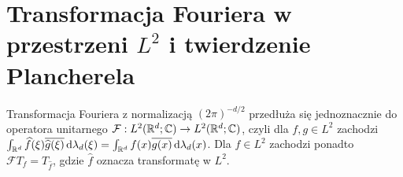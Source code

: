 \section{Transformacja Fouriera w przestrzeni $L^2$ i twierdzenie Plancherela}
\providecommand{\atlasref}[2]{#2}

\begin{twierdzenie}
\label{thm:plancherel22}
Transformacja Fouriera z normalizacją $(2\pi)^{-d/2}$
przedłuża się jednoznacznie do operatora unitarnego
$\mathcal F:L^2(\mathbb R^d;\mathbb C)\to L^2(\mathbb R^d;\mathbb C)$,
czyli dla $f,g\in L^2$ zachodzi
$\int_{\mathbb R^d}\widehat f(\xi)\overline{\widehat g(\xi)}
\,\mathrm d\lambda_d(\xi)
=\int_{\mathbb R^d}f(x)\overline{g(x)}\,\mathrm d\lambda_d(x)$.
Dla $f\in L^2$ zachodzi ponadto
$\mathcal F T_f=T_{\widehat f}$, gdzie $\widehat f$
oznacza transformatę w $L^2$.
\end{twierdzenie}
